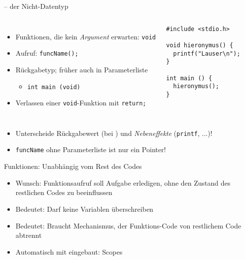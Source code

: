 
\begin{frame}[fragile]{ -- der Nicht-Datentyp}
%
\begin{columns}[T]
\begin{itemize}
\item Funktionen, die kein \emph{Argument} erwarten: \texttt{void}
\item Aufruf: \texttt{funcName();}
\item Rückgabetyp; früher auch in Parameterliste
	\begin{itemize}
	\item \texttt{int main (void)}
	\end{itemize}
\item Verlassen einer \texttt{void}-Funktion mit \texttt{return;}
\end{itemize}
%
\vspace{-10pt}
\begin{codebox}
\begin{verbatim}
#include <stdio.h>

void hieronymus() {
  printf("Lauser\n");
}

int main () {
  hieronymus();
}
\end{verbatim}
\end{codebox}
\end{columns}
%
\begin{hintbox}
\begin{itemize}
\item Unterscheide Rückgabewert (bei ) und \emph{Nebeneffekte} (\texttt{printf}, ...)!
\item \texttt{funcName} ohne Parameterliste ist nur ein Pointer!
\end{itemize}
\end{hintbox}
%
\end{frame}


\begin{frame}{Funktionen: Unabhängig vom Rest des Codes}
%
\begin{itemize}
\item Wunsch: Funktionsaufruf soll Aufgabe erledigen, ohne den Zustand des restlichen Codes zu beeinflussen
\item Bedeutet: Darf keine Variablen überschreiben
\item Bedeutet: Braucht Mechanismus, der Funktions-Code von restlichem Code abtrennt
\item[\Thus] Automatisch mit eingebaut: Scopes
\end{itemize}
%
\end{frame}

